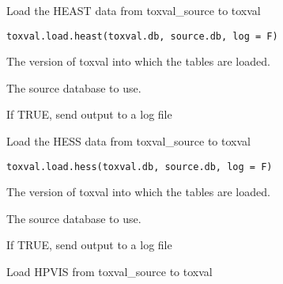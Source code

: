 \documentclass[letterpaper]{book}
\begin{document}
%
\begin{Description}\relax
Load the HEAST data from toxval\_source to toxval
\end{Description}
%
\begin{Usage}
\begin{verbatim}
toxval.load.heast(toxval.db, source.db, log = F)
\end{verbatim}
\end{Usage}
%
\begin{Arguments}
\begin{ldescription}
\item[\code{toxval.db}] The version of toxval into which the tables are loaded.

\item[\code{source.db}] The source database to use.

\item[\code{log}] If TRUE, send output to a log file
\end{ldescription}
\end{Arguments}
%
\begin{Description}\relax
Load the HESS data from toxval\_source to toxval
\end{Description}
%
\begin{Usage}
\begin{verbatim}
toxval.load.hess(toxval.db, source.db, log = F)
\end{verbatim}
\end{Usage}
%
\begin{Arguments}
\begin{ldescription}
\item[\code{toxval.db}] The version of toxval into which the tables are loaded.

\item[\code{source.db}] The source database to use.

\item[\code{log}] If TRUE, send output to a log file
\end{ldescription}
\end{Arguments}
%
\begin{Description}\relax
Load HPVIS from toxval\_source to toxval
\end{Description}
\end{document}
